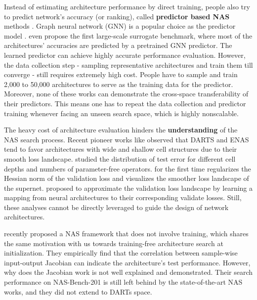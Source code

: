 \documentclass{article} \usepackage{iclr2021_conference,times}
\begin{document}
Instead of estimating architecture performance by direct training, people also try to predict network's accuracy (or ranking), called \textbf{predictor based NAS} methods \citep{liu2018progressive,luo2018neural,dai2019chamnet,luo2020semi}.
Graph neural network (GNN) is a popular choice as the predictor model \citep{wen2019neural,chen2020fitting}.
\citet{siems2020bench} even propose the first large-scale surrogate benchmark, where most of the architectures' accuracies are predicted by a pretrained GNN predictor.
The learned predictor can achieve highly accurate performance evaluation. However, the data collection step - sampling representative architectures and train them till converge - still requires extremely high cost. People have to sample and train 2,000 to 50,000 architectures to serve as the training data for the predictor. Moreover, none of these works can demonstrate the cross-space transferability of their predictors. This means one has to repeat the data collection and predictor training whenever facing an unseen search space, which is highly 
nonscalable.

The heavy cost of architecture evaluation hinders the \textbf{understanding} of the NAS search process. Recent pioneer works like 
\citet{shu2019understanding} observed that DARTS and ENAS tend to favor architectures with wide and shallow cell structures due to their smooth loss landscape. \citet{siems2020bench} studied the distribution of test error for different cell depths and numbers of parameter-free operators. \citet{chen2020stabilizing} for the first time regularizes the Hessian norm of the validation loss and visualizes the smoother loss landscape of the supernet. \citet{li2020neural} proposed to approximate the validation loss landscape by learning a mapping from neural architectures to their corresponding validate losses. 
Still, these analyses cannot be directly leveraged to guide the design of network architectures.

\citet{mellor2020neural} recently proposed a NAS framework that does not involve training, which shares the same motivation with us towards training-free architecture search at initialization. They empirically find that the correlation between sample-wise input-output Jacobian can indicate the architecture's test performance. However, why does the Jacobian work is not well explained and demonstrated. Their search performance on NAS-Bench-201 is still left behind by the state-of-the-art NAS works, and they did not extend to DARTs space.
\end{document}
